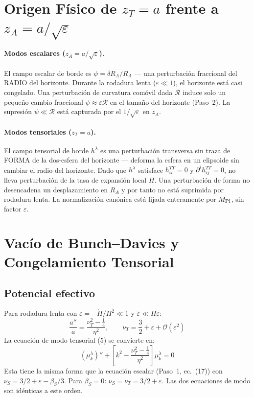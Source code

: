 \documentclass[12pt,a4paper]{article}
\begin{document}
\section{Origen Físico de $z_T = a$ frente a $z_A = a/\sqrt\varepsilon$}

\paragraph{Modos escalares ($z_A = a/\sqrt\varepsilon$).} El campo escalar de borde es $\psi = \delta R_A/R_A$ --- una perturbación fraccional del RADIO del horizonte. Durante la rodadura lenta ($\varepsilon \ll 1$), el horizonte está casi congelado. Una perturbación de curvatura comóvil dada $\mathcal{R}$ induce solo un pequeño cambio fraccional $\psi \approx \varepsilon\mathcal{R}$ en el tamaño del horizonte (Paso~2). La supresión $\psi \ll \mathcal{R}$ está capturada por el $1/\sqrt\varepsilon$ en $z_A$.

\paragraph{Modos tensoriales ($z_T = a$).} El campo tensorial de borde $h^\lambda$ es una perturbación transversa sin traza de FORMA de la dos-esfera del horizonte --- deforma la esfera en un elipsoide sin cambiar el radio del horizonte. Dado que $h^\lambda$ satisface $h^{TT}_{ii} = 0$ y $\partial^i h_{ij}^{TT} = 0$, no lleva perturbación de la tasa de expansión local $H$. Una perturbación de forma no desencadena un desplazamiento en $R_A$ y por tanto no está suprimida por rodadura lenta. La normalización canónica está fijada enteramente por $M_{\rm Pl}$, sin factor $\varepsilon$.

\section{Vacío de Bunch--Davies y Congelamiento Tensorial}

\subsection{Potencial efectivo}

Para rodadura lenta con $\varepsilon = -\dot H/H^2 \ll 1$ y $\dot\varepsilon \ll H\varepsilon$:
\begin{equation}
\frac{a''}{a} = \frac{\nu_T^2 - \tfrac{1}{4}}{\eta^2}, \qquad \nu_T = \frac{3}{2} + \varepsilon + \mathcal{O}(\varepsilon^2) \tag{7}
\end{equation}
La ecuación de modo tensorial (5) se convierte en:
\begin{equation}
(\mu_k^\lambda)'' + \left[k^2 - \frac{\nu_T^2 - \tfrac{1}{4}}{\eta^2}\right]\mu_k^\lambda = 0 \tag{8}
\end{equation}
Esta tiene la misma forma que la ecuación escalar (Paso~1, ec.~(17)) con $\nu_S = 3/2 + \varepsilon - \beta_S/3$. Para $\beta_S = 0$: $\nu_S = \nu_T = 3/2 + \varepsilon$. Las dos ecuaciones de modo son idénticas a este orden.
\end{document}
